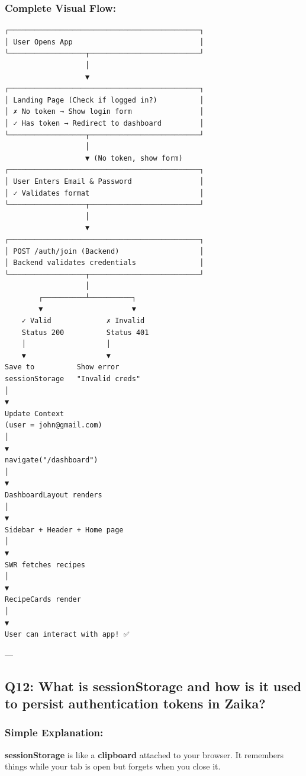 \documentclass[12pt]{article}
\begin{document}
\subsubsection*{Complete Visual Flow:}

\begin{center}
\begin{lstlisting}
┌─────────────────────────────────────────────┐
│ User Opens App                              │
└──────────────────┬──────────────────────────┘
                   │
                   ▼
┌─────────────────────────────────────────────┐
│ Landing Page (Check if logged in?)          │
│ ✗ No token → Show login form                │
│ ✓ Has token → Redirect to dashboard         │
└──────────────────┬──────────────────────────┘
                   │
                   ▼ (No token, show form)
┌─────────────────────────────────────────────┐
│ User Enters Email & Password                │
│ ✓ Validates format                          │
└──────────────────┬──────────────────────────┘
                   │
                   ▼
┌─────────────────────────────────────────────┐
│ POST /auth/join (Backend)                   │
│ Backend validates credentials               │
└──────────────────┬──────────────────────────┘
                   │
        ┌──────────┴──────────┐
        ▼                     ▼
    ✓ Valid             ✗ Invalid
    Status 200          Status 401
    │                   │
    ▼                   ▼
Save to          Show error
sessionStorage   "Invalid creds"
│
▼
Update Context
(user = john@gmail.com)
│
▼
navigate("/dashboard")
│
▼
DashboardLayout renders
│
▼
Sidebar + Header + Home page
│
▼
SWR fetches recipes
│
▼
RecipeCards render
│
▼
User can interact with app! ✅
\end{lstlisting}
\end{center}

---

\subsection{Q12: What is sessionStorage and how is it used to persist authentication tokens in Zaika?}

\subsubsection*{Simple Explanation:}

\textbf{sessionStorage} is like a \textbf{clipboard} attached to your browser. It remembers things while your tab is open but forgets when you close it.
\end{document}
